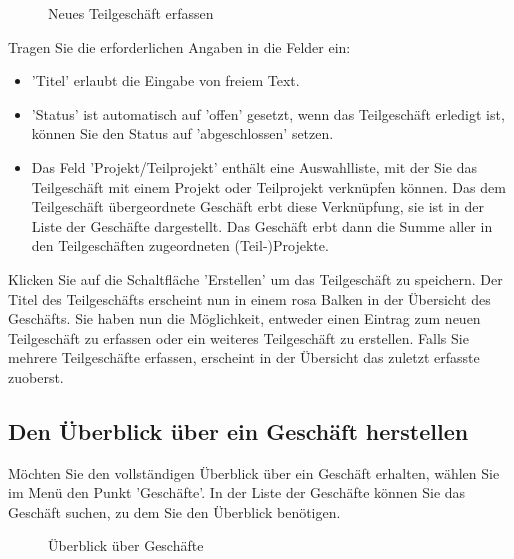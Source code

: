 \begin{figure}[H]
\caption{Neues Teilgeschäft erfassen}
\end{figure}

Tragen Sie die erforderlichen Angaben in die Felder ein:

\begin{itemize}
\item
'Titel'  erlaubt die Eingabe von freiem Text.
\item
'Status'  ist automatisch auf 'offen' gesetzt, wenn das Teilgeschäft erledigt ist, können Sie den Status auf 'abgeschlossen' setzen.
\item
Das Feld 'Projekt/Teilprojekt'  enthält eine Auswahlliste, mit der Sie das Teilgeschäft mit einem Projekt oder Teilprojekt verknüpfen können. Das dem Teilgeschäft übergeordnete Geschäft erbt diese Verknüpfung, sie ist in der Liste der Geschäfte dargestellt. Das Geschäft erbt dann die Summe aller in den Teilgeschäften zugeordneten (Teil-)Projekte.
\end{itemize}

Klicken Sie auf die Schaltfläche 'Erstellen'  um das Teilgeschäft zu speichern. Der Titel des Teilgeschäfts erscheint nun in einem rosa Balken in der Übersicht des Geschäfts. Sie haben nun die Möglichkeit, entweder einen Eintrag zum neuen Teilgeschäft zu erfassen oder ein weiteres Teilgeschäft zu erstellen. Falls Sie mehrere Teilgeschäfte erfassen, erscheint in der Übersicht das zuletzt erfasste zuoberst.

\subsection{Den Überblick über ein Geschäft herstellen}

Möchten Sie den vollständigen Überblick über ein Geschäft erhalten, wählen Sie im Menü den Punkt 'Geschäfte'. In der Liste der Geschäfte können Sie das Geschäft suchen, zu dem Sie den Überblick benötigen.

\begin{figure}[H]
\caption{Überblick über Geschäfte}
\end{figure}

